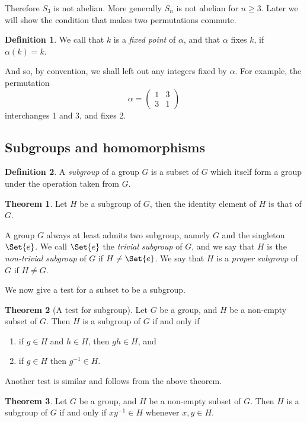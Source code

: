 \documentclass[12pt]{book}
\theoremstyle{definition}
\newtheorem{definition}{Definition}[section]
\newtheorem{theorem}{Theorem}[chapter]
\theoremstyle{remark}
\begin{document}
			Therefore $S_3$ is not abelian. More generally $S_n$ is not abelian for $n \geq 3$. Later we will show the condition that makes two permutations commute.
			\begin{definition}
				We call that $k$ is a \textit{fixed point}  of $\alpha$, and that $\alpha$ fixes $k$, if $\alpha(k) = k$.
			\end{definition}
			 And so, by convention, we shall left out any integers fixed by $\alpha$. For example, the permutation
			 \begin{equation*}
				 \alpha = \begin{pmatrix}
					 1 & 3 \\
					 3 & 1
				 \end{pmatrix}
			 \end{equation*}
			 interchanges 1 and 3, and fixes 2.
	\subsection{Subgroups and homomorphisms}
		\begin{definition}
			A \textit{subgroup} of a group $G$ is a subset of $G$ which itself form a group under the operation taken from $G$.
		\end{definition}
		\begin{theorem}
			Let $H$ be a subgroup of $G$, then the identity element of $H$ is that of $G$.
		\end{theorem}
	
		A group $G$ always at least admits two subgroup, namely $G$ and the singleton $\Set{e}$. We call $\Set{e}$ the \textit{trivial subgroup} of $G$, and we say that $H$ is the \textit{non-trivial subgroup} of $G$ if $H \neq \Set{e}$. We say that $H$ is a \textit{proper subgroup} of $G$ if $H \neq G$.
		
		We now give a test for a subset to be a subgroup.
		
		\begin{theorem}[A test for subgroup]
			Let $G$ be a group, and $H$ be a non-empty subset of $G$. Then $H$ is a subgroup of $G$ if and only if
			\begin{enumerate}
				\item if $g \in H$ and $h \in H$, then $gh \in H$, and
				\item if $g \in H$ then $g^{-1} \in H$.
			\end{enumerate}
		\end{theorem}
		
		Another test is similar and follows from the above theorem.
		\begin{theorem}
			Let $G$ be a group, and $H$ be a non-empty subset of $G$. Then $H$ is a subgroup of $G$ if and only if $xy^{-1} \in H$ whenever $x,y \in H$.
		\end{theorem}
		
\end{document}

